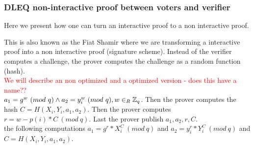 \subsubsection{DLEQ non-interactive proof between voters and verifier}
Here we present how one can turn an interactive proof to a non interactive proof.

 This is also known as the Fiat Shamir where we are transforming a interactive proof into a non interactive proof (signature scheme). Instead of the verifier computes a challenge, the prover computes the challenge as a random function (hash).\\
\textcolor{red}{We will describe an non optimized and a optimized version - does this have a name??}\\


 \begin{math}a_1=g^w \ (mod\ q)  \land a_2=y_i^w \ (mod\ q),  w\in_R \Z_q \end{math}. Then the prover computes the hash \begin{math}C=H(X_i,Y_i,a_1,a_2) \end{math}. Then the prover computes  \begin{math}r=w-p(i) * C \ (mod\ q)\end{math}. Last the prover publish \begin{math}a_1, a_2,r,C\end{math}. \\

\noindent
{} the following computations \begin{math}a_1 = g^r*X_i^C  \ (mod\ q)\end{math} and \begin{math} a_2=y_i^r * Y_i^C \ (mod\ q)\end{math} and \begin{math}C=H(X_i,Y_i,a_1,a_2)\end{math}.


